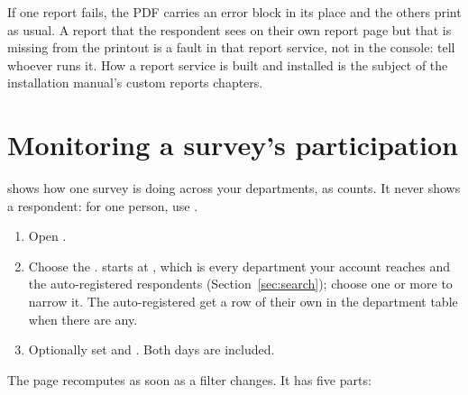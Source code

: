 \documentclass[11pt, a4paper]{article}
\begin{document}
If one report fails, the PDF carries an error block in its place and the others print as
usual. A report that the respondent sees on their own report page but that is missing from the
printout is a fault in that report service, not in the console: tell whoever runs it. How a
report service is built and installed is the subject of the installation manual's custom
reports chapters.

\section{Monitoring a survey's participation}
\label{sec:participation}

 shows how one survey is doing across your departments, as counts. It never
shows a respondent: for one person, use .

\begin{enumerate}
  \item Open .
  \item Choose the .  starts at , which is every
        department your account reaches and the auto-registered respondents
        (Section~\ref{sec:search}); choose one or more to narrow it. The auto-registered get a
        row of their own in the department table when there are any.
  \item Optionally set  and . Both days are included.
\end{enumerate}


The page recomputes as soon as a filter changes. It has five parts:
\end{document}
